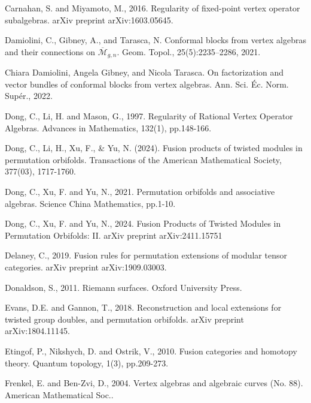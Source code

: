\documentclass[11pt,b5paper,notitlepage]{article}
\theoremstyle{definition}
\theoremstyle{plain}
\newcommand{\mc}{\mathcal}
\newcommand{\ovl}{\overline}
\numberwithin{equation}{subsection}
\begin{document}
\begin{thebibliography}{999999}
Carnahan, S. and Miyamoto, M., 2016. Regularity of fixed-point vertex operator subalgebras. arXiv preprint arXiv:1603.05645.


Damiolini, C., Gibney, A., and Tarasca, N. Conformal blocks from vertex algebras and their connections on $\ovl{\mc M}_{g,n}$.  Geom. Topol., 25(5):2235–2286, 2021.

Chiara Damiolini, Angela Gibney, and Nicola Tarasca. On factorization and vector bundles of conformal blocks from vertex algebras. Ann. Sci. \'Ec. Norm. Sup\'er., 2022.




		
Dong, C., Li, H. and Mason, G., 1997. Regularity of Rational Vertex Operator Algebras. Advances in Mathematics, 132(1), pp.148-166.	





Dong, C., Li, H., Xu, F., \& Yu, N. (2024). Fusion products of twisted modules in permutation orbifolds. Transactions of the American Mathematical Society, 377(03), 1717-1760.

Dong, C., Xu, F. and Yu, N., 2021. Permutation orbifolds and associative algebras. Science China Mathematics, pp.1-10.


Dong, C., Xu, F. and Yu, N., 2024. Fusion Products of Twisted Modules in Permutation Orbifolds: II. arXiv preprint arXiv:2411.15751


Delaney, C., 2019. Fusion rules for permutation extensions of modular tensor categories. arXiv preprint arXiv:1909.03003.


Donaldson, S., 2011. Riemann surfaces. Oxford University Press.

Evans, D.E. and Gannon, T., 2018. Reconstruction and local extensions for twisted group doubles, and permutation orbifolds. arXiv preprint arXiv:1804.11145.


Etingof, P., Nikshych, D. and Ostrik, V., 2010. Fusion categories and homotopy theory. Quantum topology, 1(3), pp.209-273.


Frenkel, E. and Ben-Zvi, D., 2004. Vertex algebras and algebraic curves (No. 88). American Mathematical Soc..



\end{thebibliography}
\end{document}
